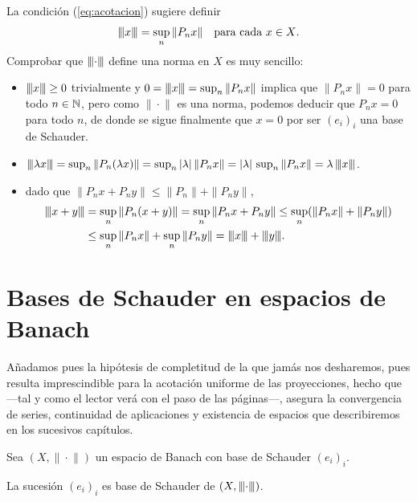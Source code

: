 	\begin{nota}
		La condición (\ref{eq:acotacion}) sugiere definir
		\[\vertiii{x}=\sup_n\|P_nx\|\quad\text{para cada $x\in X$.}\]
		Comprobar que $\vertiii{\cdot}$ define una norma en $X$ es muy sencillo:
		\begin{itemize}
			\item[(N1)]{$\vertiii{x}\geq 0$ trivialmente y $0=\vertiii{x}=\sup_{n}{\|P_nx\|}$ implica que  $\|P_nx\|=0$ para todo $n\in\N$, pero como $\|\!\cdot\!\|$ es una norma, podemos deducir que $P_nx=0$ para todo $n$, de donde se sigue finalmente que $x=0$ por ser $(e_i)_i$ una base de Schauder.}
			\item[(N2)]{$\vertiii{\lambda x}=\sup_n\|P_n(\lambda x)\|=\sup_n|\lambda|\,\|P_nx\|=|\lambda|\, \sup_n\|P_nx\|=\lambda\,\vertiii{x}$.}
			\item[(N3)]{dado que $\|P_nx+P_ny\|\leq \|P_n\|+\|P_ny\|$,
				\begin{align*}
					\vertiii{x+y}&=\sup_n\|P_n(x+y)\|=\sup_n\|P_nx + P_ny\|\leq\sup_n(\|P_nx\|+\|P_ny\|)\\ 
					&\leq\sup_n\|P_nx\|+\sup_n\|P_ny\|= \vertiii{x} + \vertiii{y}.
			\end{align*}}
		\end{itemize}
	\end{nota}
	
	\section{Bases de Schauder en espacios de Banach}
	
	Añadamos pues la hipótesis de completitud de la que jamás nos desharemos, pues resulta imprescindible para la acotación uniforme de las proyecciones, hecho que ---tal y como el lector verá con el paso de las páginas---, asegura la convergencia de series, continuidad de aplicaciones  y existencia de espacios que describiremos en los sucesivos capítulos.
	
	Sea $(X,\|\!\cdot\!\|)$ un espacio de Banach con base de Schauder $(e_i)_i$.
	
	\begin{proposition}\label{P:1.5}
		La sucesión $(e_i)_i$ es base de Schauder de $(X,\vertiii{\cdot})$.
	\end{proposition}
	
